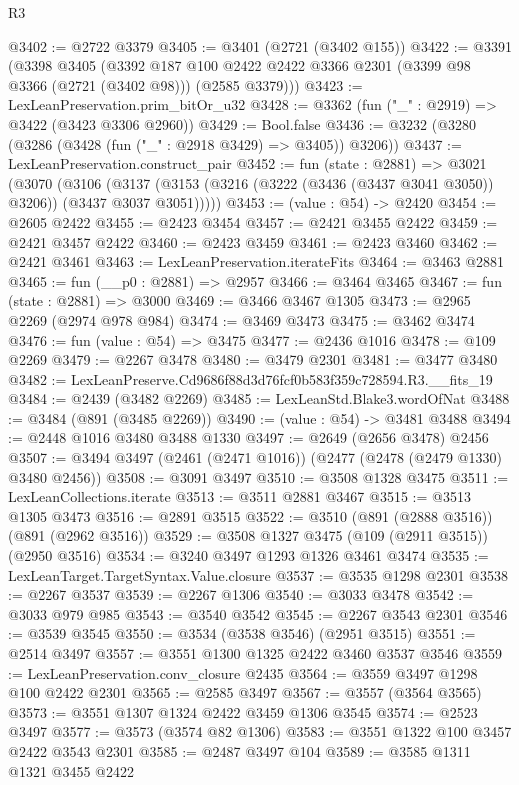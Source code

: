 \begin{lexlean}{R3}
\begin{coremodule}
@3402 := @2722 @3379
@3405 := @3401 (@2721 (@3402 @155))
@3422 := @3391
    (@3398
      @3405
      (@3392 @187 @100 @2422 @2422 @3366 @2301 (@3399 @98 @3366 (@2721 (@3402 @98))) (@2585 @3379)))
@3423 := LexLeanPreservation.prim_bitOr_u32
@3428 := @3362 (fun ("_" : @2919) => @3422 (@3423 @3306 @2960))
@3429 := Bool.false
@3436 := @3232 (@3280 (@3286 (@3428 (fun ("_" : @2918 @3429) => @3405)) @3206))
@3437 := LexLeanPreservation.construct_pair
@3452 := fun (state : @2881) =>
  @3021
    (@3070
      (@3106 (@3137 (@3153 (@3216 (@3222 (@3436 (@3437 @3041 @3050)) @3206)) (@3437 @3037 @3051)))))
@3453 := (value : @54) -> @2420
@3454 := @2605 @2422
@3455 := @2423 @3454
@3457 := @2421 @3455 @2422
@3459 := @2421 @3457 @2422
@3460 := @2423 @3459
@3461 := @2423 @3460
@3462 := @2421 @3461
@3463 := LexLeanPreservation.iterateFits
@3464 := @3463 @2881
@3465 := fun (__p0 : @2881) => @2957
@3466 := @3464 @3465
@3467 := fun (state : @2881) => @3000
@3469 := @3466 @3467 @1305
@3473 := @2965 @2269 (@2974 @978 @984)
@3474 := @3469 @3473
@3475 := @3462 @3474
@3476 := fun (value : @54) => @3475
@3477 := @2436 @1016
@3478 := @109 @2269
@3479 := @2267 @3478
@3480 := @3479 @2301
@3481 := @3477 @3480
@3482 := LexLeanPreserve.Cd9686f88d3d76fcf0b583f359c728594.R3.__fits_19
@3484 := @2439 (@3482 @2269)
@3485 := LexLeanStd.Blake3.wordOfNat
@3488 := @3484 (@891 (@3485 @2269))
@3490 := (value : @54) -> @3481 @3488
@3494 := @2448 @1016 @3480 @3488 @1330
@3497 := @2649 (@2656 @3478) @2456
@3507 := @3494 @3497 (@2461 (@2471 @1016)) (@2477 (@2478 (@2479 @1330) @3480 @2456))
@3508 := @3091 @3497
@3510 := @3508 @1328 @3475
@3511 := LexLeanCollections.iterate
@3513 := @3511 @2881 @3467
@3515 := @3513 @1305 @3473
@3516 := @2891 @3515
@3522 := @3510 (@891 (@2888 @3516)) (@891 (@2962 @3516))
@3529 := @3508 @1327 @3475 (@109 (@2911 @3515)) (@2950 @3516)
@3534 := @3240 @3497 @1293 @1326 @3461 @3474
@3535 := LexLeanTarget.TargetSyntax.Value.closure
@3537 := @3535 @1298 @2301
@3538 := @2267 @3537
@3539 := @2267 @1306
@3540 := @3033 @3478
@3542 := @3033 @979 @985
@3543 := @3540 @3542
@3545 := @2267 @3543 @2301
@3546 := @3539 @3545
@3550 := @3534 (@3538 @3546) (@2951 @3515)
@3551 := @2514 @3497
@3557 := @3551 @1300 @1325 @2422 @3460 @3537 @3546
@3559 := LexLeanPreservation.conv_closure @2435
@3564 := @3559 @3497 @1298 @100 @2422 @2301
@3565 := @2585 @3497
@3567 := @3557 (@3564 @3565)
@3573 := @3551 @1307 @1324 @2422 @3459 @1306 @3545
@3574 := @2523 @3497
@3577 := @3573 (@3574 @82 @1306)
@3583 := @3551 @1322 @100 @3457 @2422 @3543 @2301
@3585 := @2487 @3497 @104
@3589 := @3585 @1311 @1321 @3455 @2422

\end{coremodule}
\end{lexlean}

